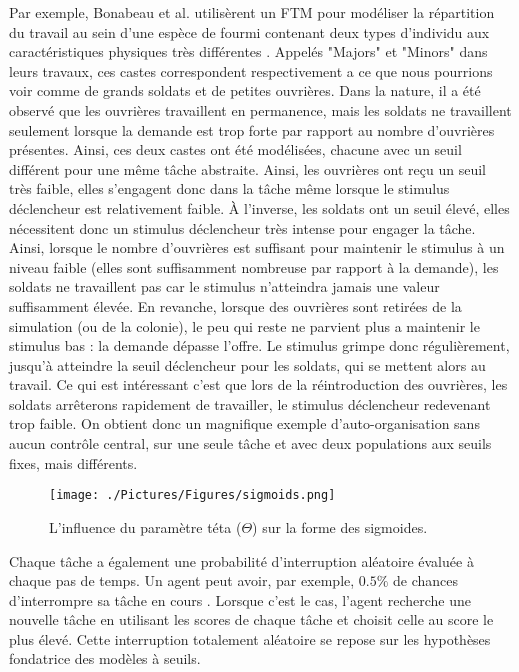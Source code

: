         Par exemple, Bonabeau et al. \cite{bonabeau_quantitative_1996} utilisèrent un FTM pour modéliser la répartition du travail au sein d'une espèce de fourmi contenant deux types d'individu aux caractéristiques physiques très différentes \cite{wilson_relation_1984}. Appelés "Majors" et "Minors" dans leurs travaux, ces castes correspondent respectivement a ce que nous pourrions voir comme de grands soldats et de petites ouvrières. Dans la nature, il a été observé que les ouvrières travaillent en permanence, mais les soldats ne travaillent seulement lorsque la demande est trop forte par rapport au nombre d'ouvrières présentes. Ainsi, ces deux castes ont été modélisées, chacune avec un seuil différent pour une même tâche abstraite. Ainsi, les ouvrières ont reçu un seuil très faible, elles s'engagent donc dans la tâche même lorsque le stimulus déclencheur est relativement faible. À l'inverse, les soldats ont un seuil élevé, elles nécessitent donc un stimulus déclencheur très intense pour engager la tâche. Ainsi, lorsque le nombre d'ouvrières est suffisant pour maintenir le stimulus à un niveau faible (elles sont suffisamment nombreuse par rapport à la demande), les soldats ne travaillent pas car le stimulus n'atteindra jamais une valeur suffisamment élevée. En revanche, lorsque des ouvrières sont retirées de la simulation (ou de la colonie), le peu qui reste ne parvient plus a maintenir le stimulus bas : la demande dépasse l'offre. Le stimulus grimpe donc régulièrement, jusqu'à atteindre la seuil déclencheur pour les soldats, qui se mettent alors au travail. Ce qui est intéressant c'est que lors de la réintroduction des ouvrières, les soldats arrêterons rapidement de travailler, le stimulus déclencheur redevenant trop faible. On obtient donc un magnifique exemple d'auto-organisation sans aucun contrôle central, sur une seule tâche et avec deux populations aux seuils fixes, mais différents.
		
		\begin{figure}
		\centering
		\texttt{[image: ./Pictures/Figures/sigmoids.png]}
		\caption{L'influence du paramètre téta ($\Theta$) sur la forme des sigmoides.}
		\label{sigmoids}
		\end{figure}
		
		Chaque tâche a également une probabilité d'interruption aléatoire évaluée à chaque pas de temps. Un agent peut avoir, par exemple, $0.5\%$ de chances d'interrompre sa tâche en cours \cite{schmickl_analysing_2008}. Lorsque c'est le cas, l'agent recherche une nouvelle tâche en utilisant les scores de chaque tâche et choisit celle au score le plus élevé. Cette interruption totalement aléatoire se repose sur les hypothèses fondatrice des modèles à seuils.
        
